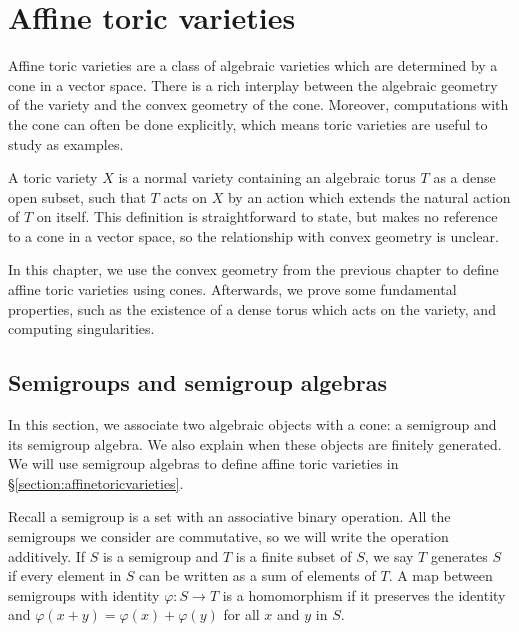 \documentclass[12pt]{amsart}
\theoremstyle{plain}
\begin{document}
\newpage
{}
\section{Affine toric varieties}\label{affinetoricvarieties}
Affine toric varieties are a class of algebraic varieties which are determined by a cone in a vector space.
There is a rich interplay between the algebraic geometry of the variety and the convex geometry of the cone.
Moreover, computations with the cone can often be done explicitly, which means toric varieties are useful to study as examples.

A toric variety $X$ is a normal variety containing an algebraic torus $T$ as a dense open subset, such that $T$ acts on $X$ by an action which extends the natural action of $T$ on itself.
This definition is straightforward to state, but makes no reference to a cone in a vector space, so the relationship with convex geometry is unclear.

In this chapter, we use the convex geometry from the previous chapter to define affine toric varieties using cones.
Afterwards, we prove some fundamental properties, such as the existence of a dense torus which acts on the variety, and computing singularities.






\subsection{Semigroups and semigroup algebras}
In this section, we associate two algebraic objects with a cone: a semigroup and its semigroup algebra.
We also explain when these objects are finitely generated.
We will use semigroup algebras to define affine toric varieties in \S \ref{section:affinetoricvarieties}.

Recall a semigroup is a set with an associative binary operation.
All the semigroups we consider are commutative, so we will write the operation additively.
If $S$ is a semigroup and $T$ is a finite subset of $S$, we say $T$ generates $S$ if every element in $S$ can be written as a sum of elements of $T$.
A map between semigroups with identity $\varphi : S \to T$ is a homomorphism if it preserves the identity and $\varphi(x + y) = \varphi(x) + \varphi(y)$ for all $x$ and $y$ in $S$.
\end{document}
